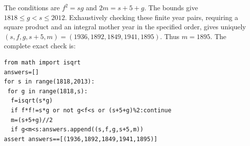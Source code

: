 The conditions are $f^2=sg$ and $2m=s+5+g$. The bounds give $1818\le g<s\le2012$. Exhaustively checking these finite year pairs, requiring a square product and an integral mother year in the specified order, gives uniquely $(s,f,g,s+5,m)=(1936,1892,1849,1941,1895)$. Thus $\boxed{m=1895}$. The complete exact check is:
\begin{verbatim}
from math import isqrt
answers=[]
for s in range(1818,2013):
 for g in range(1818,s):
  f=isqrt(s*g)
  if f*f!=s*g or not g<f<s or (s+5+g)%2:continue
  m=(s+5+g)//2
  if g<m<s:answers.append((s,f,g,s+5,m))
assert answers==[(1936,1892,1849,1941,1895)]
\end{verbatim}
